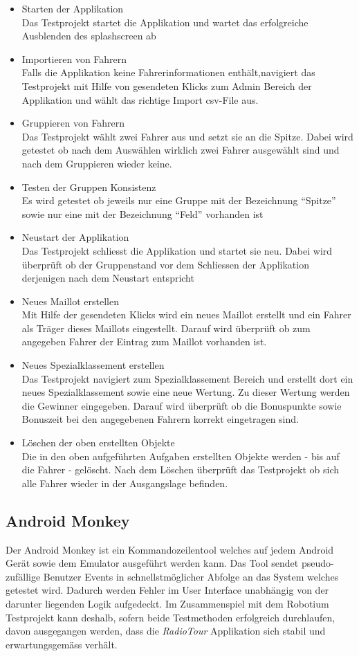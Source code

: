 \begin{itemize}
\item Starten der Applikation\\
Das Testprojekt startet die Applikation und wartet das erfolgreiche Ausblenden des \gls{splashscreen} ab
\item Importieren von Fahrern\\
Falls die Applikation keine Fahrerinformationen enthält,navigiert das Testprojekt mit Hilfe von gesendeten Klicks zum Admin Bereich der Applikation und wählt das richtige Import csv-File aus.
\item Gruppieren von Fahrern\\
Das Testprojekt wählt zwei Fahrer aus und setzt sie an die Spitze. Dabei wird getestet ob nach dem Auswählen wirklich zwei Fahrer ausgewählt sind und nach dem Gruppieren wieder keine.
\item Testen der Gruppen Konsistenz\\
Es wird getestet ob jeweils nur eine Gruppe mit der Bezeichnung "`Spitze"' sowie nur eine mit der Bezeichnung "`Feld"' vorhanden ist
\item Neustart der Applikation\\
Das Testprojekt schliesst die Applikation und startet sie neu. Dabei wird überprüft ob der Gruppenstand vor dem Schliessen der Applikation derjenigen nach dem Neustart entspricht
\item Neues Maillot erstellen\\
Mit Hilfe der gesendeten Klicks wird ein neues Maillot erstellt und ein Fahrer als Träger dieses Maillots eingestellt. Darauf wird überprüft ob zum angegeben Fahrer der Eintrag zum Maillot vorhanden ist.
\item Neues Spezialklassement erstellen\\
Das Testprojekt navigiert zum Spezialklassement Bereich und erstellt dort ein neues Spezialklassement sowie eine neue Wertung. Zu dieser Wertung werden die Gewinner eingegeben. Darauf wird überprüft ob die Bonuspunkte sowie Bonuszeit bei den angegebenen Fahrern korrekt eingetragen sind.
\item Löschen der oben erstellten Objekte \\
Die in den oben aufgeführten Aufgaben erstellten Objekte werden - bis auf die Fahrer -  gelöscht. Nach dem Löschen überprüft das Testprojekt ob sich alle Fahrer wieder in der Ausgangslage befinden.
\end{itemize}

\subsection{Android Monkey}
Der Android Monkey ist ein Kommandozeilentool welches auf jedem Android Gerät sowie dem Emulator ausgeführt werden kann. Das Tool sendet pseudo-zufällige Benutzer Events in schnellstmöglicher Abfolge an das System welches getestet wird. Dadurch werden Fehler im User Interface unabhängig von der darunter liegenden Logik aufgedeckt. Im Zusammenspiel mit dem Robotium Testprojekt kann deshalb, sofern beide Testmethoden erfolgreich durchlaufen, davon ausgegangen werden, dass die \textit{RadioTour} Applikation sich stabil und erwartungsgemäss verhält.

